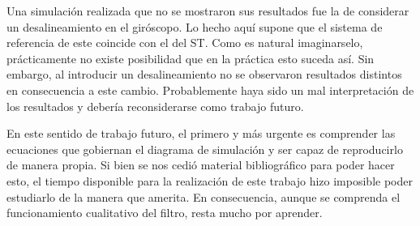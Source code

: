 \documentclass[a4paper,11pt,twoside]{IT-CNEA}
\begin{document}
\par Una simulación realizada que no se mostraron sus resultados fue la de considerar un desalineamiento en el giróscopo. Lo hecho aquí supone que el sistema de referencia de este coincide con el del ST. Como es natural imaginarselo, prácticamente no existe posibilidad que en la práctica esto suceda así. Sin embargo, al introducir un desalineamiento no se observaron resultados distintos en consecuencia a este cambio. Probablemente haya sido un mal interpretación de los resultados y debería reconsiderarse como trabajo futuro.
\par En este sentido de trabajo futuro, el primero y más urgente es comprender las ecuaciones que gobiernan el diagrama de simulación y ser capaz de reproducirlo de manera propia. Si bien se nos cedió material bibliográfico para poder hacer esto, el tiempo disponible para la realización de este trabajo hizo imposible poder estudiarlo de la manera que amerita. En consecuencia, aunque se comprenda el funcionamiento cualitativo del filtro, resta mucho por aprender. 

\clearpage
\newpage


\end{document}
